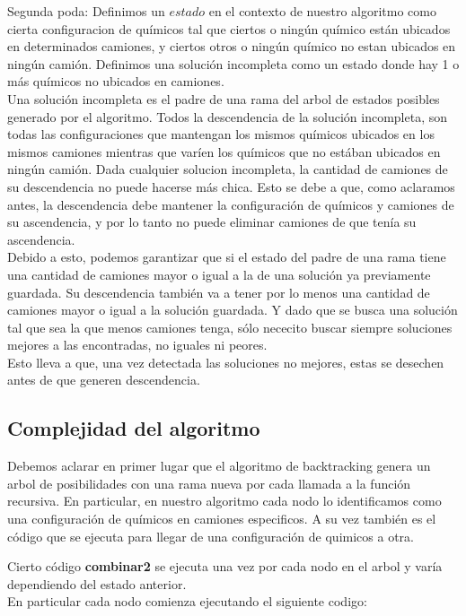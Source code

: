 \noindent
Segunda poda:
Definimos un $estado$ en el contexto de nuestro algoritmo como cierta configuracion de qu\'imicos tal que ciertos o ning\'un qu\'imico est\'an ubicados en determinados camiones, y ciertos otros o ning\'un qu\'imico no estan ubicados en ning\'un cami\'on.
Definimos una soluci\'on incompleta como un estado donde hay 1 o m\'as qu\'imicos no ubicados en camiones. \\
Una soluci\'on incompleta es el padre de una rama del arbol de estados posibles generado por el algoritmo. Todos la descendencia de la soluci\'on incompleta, son todas las configuraciones que mantengan los mismos qu\'imicos ubicados en los mismos camiones mientras que var\'ien los qu\'imicos que no est\'aban ubicados en ning\'un cami\'on.
Dada cualquier solucion incompleta, la cantidad de camiones de su descendencia no puede hacerse m\'as chica. Esto se debe a que, como aclaramos antes, la descendencia debe mantener la configuraci\'on de qu\'imicos y camiones de su ascendencia, y por lo tanto no puede eliminar camiones de que ten\'ia su ascendencia. \\
Debido a esto, podemos garantizar que si el estado del padre de una rama tiene una cantidad de camiones mayor o igual a la de una soluci\'on ya previamente guardada. Su descendencia tambi\'en va a tener por lo menos una cantidad de camiones mayor o igual a la soluci\'on guardada. Y dado que se busca una soluci\'on tal que sea la que menos camiones tenga, s\'olo nececito buscar siempre soluciones mejores a las encontradas, no iguales ni peores.\\
Esto lleva a que, una vez detectada las soluciones no mejores, estas se desechen antes de que generen descendencia.\\


\subsection{Complejidad del algoritmo}


\noindent
Debemos aclarar en primer lugar que el algoritmo de backtracking genera un arbol de posibilidades con una rama nueva por cada llamada a la funci\'on recursiva. En particular, en nuestro algoritmo cada nodo lo identificamos como una configuraci\'on de qu\'imicos en camiones especificos. A su vez tambi\'en es el c\'odigo que se ejecuta para llegar de una configuraci\'on de quimicos a otra.

\noindent
Cierto c\'odigo \textbf{combinar2} se ejecuta una vez por cada nodo en el arbol y var\'ia dependiendo del estado anterior. \\
En particular cada nodo comienza ejecutando el siguiente codigo:

